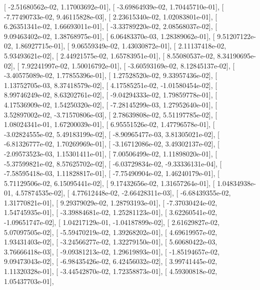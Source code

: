 \documentclass{article}
\begin{document}
       [ -2.51680562e-02,   1.17003692e-01],
       [ -3.69864939e-02,   1.70445710e-01],
       [ -7.77490733e-02,   9.46115828e-03],
       [  2.23615340e-02,   1.02083801e-01],
       [  6.26351341e-02,   1.66693011e-01],
       [ -3.33789220e-02,   2.08568037e-02],
       [  9.09463402e-02,   1.38768975e-01],
       [  6.06483370e-03,   1.28389062e-01],
       [  9.51207122e-02,   1.86927715e-01],
       [  9.06559349e-02,   1.43030872e-01],
       [  2.11137418e-02,   5.93493621e-02],
       [  2.44921575e-02,   1.65783951e-01],
       [  8.55080537e-02,   8.34190695e-02],
       [  7.92241997e-02,   1.50016792e-01],
       [ -3.60593169e-02,   8.12845137e-02],
       [ -3.40575089e-02,   1.77855396e-01],
       [  1.27528520e-02,   9.33957436e-02],
       [  1.13752705e-03,   8.37418579e-02],
       [  4.17585251e-02,  -1.01580454e-02],
       [  8.99746249e-02,   8.63202761e-02],
       [ -9.04294333e-02,   1.79859778e-01],
       [  4.17536909e-02,   1.54250320e-02],
       [ -7.28145299e-03,   1.27952640e-01],
       [  3.52897002e-02,  -3.71570806e-03],
       [  2.78639808e-02,   5.51197785e-02],
       [  1.08024341e-01,   1.67200039e-01],
       [  6.95551526e-02,   1.47796578e-01],
       [ -3.02824555e-02,   5.49183199e-02],
       [ -8.90965477e-03,   3.81305021e-02],
       [ -6.81326777e-02,   1.70269969e-01],
       [ -3.16712086e-02,   3.49302137e-02],
       [ -2.09573523e-03,   1.15301411e-01],
       [  7.00506499e-02,   1.11898020e-01],
       [ -5.37599821e-02,   8.57625702e-02],
       [ -6.03729834e-02,  -9.33336131e-04],
       [ -7.58595418e-03,   1.11828817e-01],
       [ -7.75490904e-02,   1.46240179e-01],
       [  5.71129506e-02,   6.15095441e-02],
       [  9.17432656e-02,   1.31657264e-01],
       [  1.04834938e-01,   4.57874535e-02],
       [  4.77612448e-02,  -2.66428311e-03],
       [ -6.68439355e-02,   1.31770821e-01],
       [  9.29379029e-02,   1.28793193e-01],
       [ -7.37030424e-02,   1.54745935e-01],
       [ -3.39884681e-02,   1.25281123e-01],
       [  3.62260541e-02,  -1.09651747e-02],
       [  1.04217129e-01,  -1.04187899e-02],
       [  2.61629827e-02,   5.07097505e-02],
       [ -5.59470219e-02,   1.39268202e-01],
       [  4.69619957e-02,   1.93431403e-02],
       [ -3.24566277e-02,   1.32279150e-01],
       [  5.60680422e-03,   3.76666418e-03],
       [ -9.09381213e-02,   1.29619893e-01],
       [ -1.85194657e-02,   9.09473043e-02],
       [ -6.98435426e-02,   6.42456032e-02],
       [  3.99741445e-02,   1.11320328e-01],
       [ -3.44542870e-02,   1.72358873e-01],
       [  4.59300818e-02,   1.05437703e-01],
\end{document}
